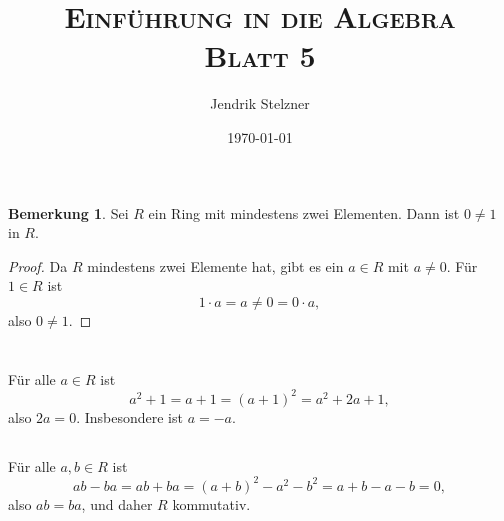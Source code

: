 \documentclass[a4paper,10pt]{article}
\title{\textsc{Einführung in die Algebra \\ \Large Blatt 5}}
\author{Jendrik Stelzner}
\date{\today}
\theoremstyle{definition}
\newtheorem{bem}[beh]{Bemerkung}
\begin{document}
\maketitle





\section{}





\section{}





\section{}

\begin{bem}\label{bem: 0 neq 1}
 Sei $R$ ein Ring mit mindestens zwei Elementen. Dann ist $0 \neq 1$ in $R$.
\end{bem}
\begin{proof}
 Da $R$ mindestens zwei Elemente hat, gibt es ein $a \in R$ mit $a \neq 0$. Für $1 \in R$ ist
 \[
  1 \cdot a = a \neq 0 = 0 \cdot a,
 \]
 also $0 \neq 1$.
\end{proof}







\section{}


\addtocounter{subsection}{1}
\subsection{}
Für alle $a \in R$ ist
\[
 a^2 + 1 = a+1 = (a+1)^2 = a^2 + 2a + 1,
\]
also $2a = 0$. Insbesondere ist $a = -a$.


\addtocounter{subsection}{-2}
\subsection{}
Für alle $a,b \in R$ ist
\[
 ab-ba = ab + ba = (a+b)^2 - a^2 - b^2 = a+b-a-b = 0,
\]
also $ab = ba$, und daher $R$ kommutativ.
\end{document}
